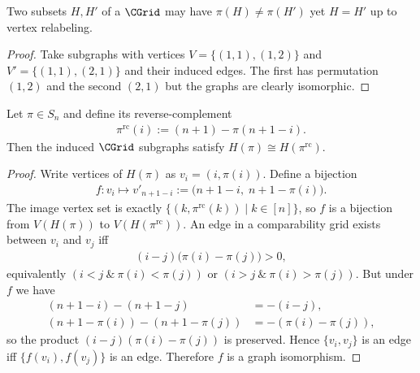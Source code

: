 \begin{fact}
\label{fact:tuple-not-unique}
Two subsets $H,H'$ of a $\CGrid$ may have $\pi(H) \neq \pi(H')$ yet $H = H'$ up to vertex relabeling.
\begin{proof}
Take subgraphs with vertices $V = \{(1,1), (1,2)\}$ and $V' = \{(1,1), (2,1)\}$ and their induced edges. The first has permutation $(1,2)$ and the second $(2,1)$ but the graphs are clearly isomorphic.
\end{proof}
\end{fact}

\begin{fact}
Let $\pi\in S_n$ and define its reverse-complement
\begin{align}
    \pi^{\mathrm{rc}}(i) := (n+1) - \pi(n+1-i).
\end{align}
Then the induced $\CGrid$ subgraphs satisfy $H(\pi)\cong H(\pi^{\mathrm{rc}})$.
\begin{proof}
Write vertices of $H(\pi)$ as $v_i=(i,\pi(i))$. Define a bijection
\begin{align}
    f: v_i \mapsto v'_{n+1-i} := \bigl(n+1-i,\; n+1-\pi(i)\bigr).    
\end{align}
The image vertex set is exactly $\{(k,\pi^{\mathrm{rc}}(k)) \mid k\in[n]\}$, so $f$ is a bijection from $V(H(\pi))$ to $V(H(\pi^{\mathrm{rc}}))$.
An edge in a comparability grid exists between $v_i$ and $v_j$ iff
\begin{align}
    (i-j)\bigl(\pi(i)-\pi(j)\bigr) > 0,    
\end{align}
equivalently $(i<j \ \&\ \pi(i)<\pi(j))$ or $(i>j \ \&\ \pi(i)>\pi(j))$. But under $f$ we have
\begin{align}
    (n+1-i)-(n+1-j) &= -(i-j),\\
    (n+1-\pi(i))-(n+1-\pi(j)) &= -(\pi(i)-\pi(j)),    
\end{align}
so the product $(i-j)(\pi(i)-\pi(j))$ is preserved. Hence $\{v_i,v_j\}$ is an edge iff $\{f(v_i),f(v_j)\}$ is an edge. Therefore $f$ is a graph isomorphism.
\end{proof}
\end{fact}

